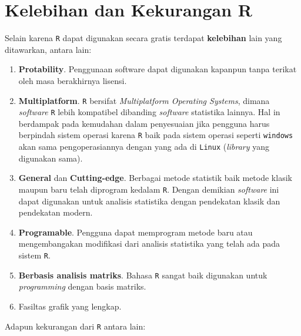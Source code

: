 \documentclass[]{book}
\providecommand{\tightlist}{%
  \setlength{\itemsep}{0pt}\setlength{\parskip}{0pt}}
\theoremstyle{definition}
\theoremstyle{definition}
\theoremstyle{definition}
\theoremstyle{remark}
\begin{document}
\hypertarget{prosconsR}{%
\section{Kelebihan dan Kekurangan R}\label{prosconsR}}

Selain karena \texttt{R} dapat digunakan secara gratis terdapat \textbf{kelebihan} lain yang ditawarkan, antara lain:

\begin{enumerate}
\def\labelenumi{\arabic{enumi}.}
\tightlist
\item
  \textbf{Protability}. Penggunaan software dapat digunakan kapanpun tanpa terikat oleh masa berakhirnya lisensi.
\item
  \textbf{Multiplatform}. \texttt{R} bersifat \emph{Multiplatform Operating Systems}, dimana \emph{software} \texttt{R} lebih kompatibel dibanding \emph{software} statistika lainnya. Hal in berdampak pada kemudahan dalam penyesuaian jika pengguna harus berpindah sistem operasi karena \texttt{R} baik pada sistem operasi seperti \texttt{windows} akan sama pengoperasiannya dengan yang ada di \texttt{Linux} (\emph{library} yang digunakan sama).
\item
  \textbf{General} dan \textbf{Cutting-edge}. Berbagai metode statistik baik metode klasik maupun baru telah diprogram kedalam \texttt{R}. Dengan demikian \emph{software} ini dapat digunakan untuk analisis statistika dengan pendekatan klasik dan pendekatan modern.
\item
  \textbf{Programable}. Pengguna dapat memprogram metode baru atau mengembangakan modifikasi dari analisis statistika yang telah ada pada sistem \texttt{R}.
\item
  \textbf{Berbasis analisis matriks}. Bahasa \texttt{R} sangat baik digunakan untuk \emph{programming} dengan basis matriks.
\item
  Fasiltas grafik yang lengkap.
\end{enumerate}

Adapun kekurangan dari \texttt{R} antara lain:
\end{document}
